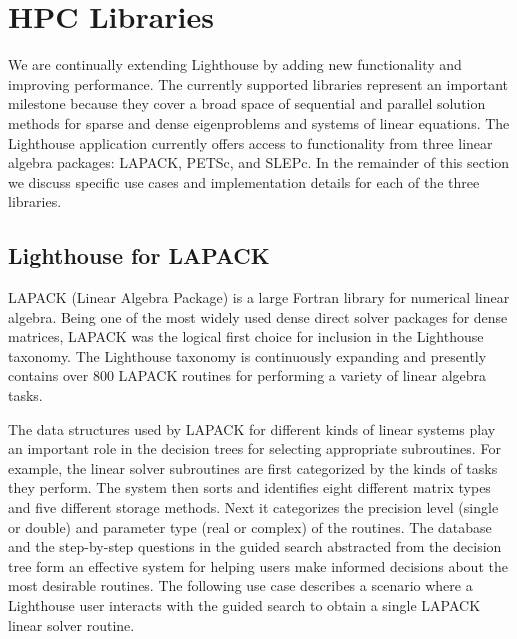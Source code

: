 \documentclass{sig-alternate}
\begin{document}
\section{HPC Libraries}
\label{sec:result}


We are continually extending Lighthouse by adding new functionality and improving performance. The currently
supported libraries represent an important milestone because they cover a broad space of sequential
and parallel solution methods
for sparse and dense eigenproblems and systems of linear equations.
The Lighthouse application currently offers access to functionality from three linear algebra packages: LAPACK, PETSc, and SLEPc. 
In the remainder of this section we discuss specific use cases and implementation details for each of the three libraries. 

\subsection{Lighthouse for LAPACK}
LAPACK (Linear Algebra Package) is a large Fortran library for numerical linear algebra.
Being one of the most widely used dense direct solver packages for dense matrices, LAPACK was the
logical first choice for inclusion in the Lighthouse taxonomy.
The Lighthouse taxonomy is continuously expanding and presently contains over 800
LAPACK routines for performing a variety of linear algebra tasks.

The data structures used by LAPACK for different kinds of linear systems play an important role in 
the decision trees for selecting appropriate subroutines.
For example, the linear solver subroutines are first categorized by the kinds of tasks they perform. The system then sorts and identifies
eight different matrix types and five different storage methods. Next it categorizes the precision level (single or double) and
parameter type (real or complex) of the routines. The database and the step-by-step questions in the guided search abstracted from the
decision tree form an effective system for helping users make informed decisions about the most desirable routines. The following
use case describes a scenario where a Lighthouse user interacts with the guided search to obtain a single LAPACK linear solver routine.
\end{document}
